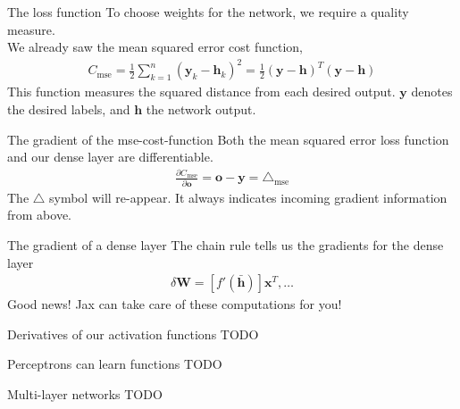 \documentclass[notes]{beamer}
\begin{document}
    \begin{frame}{The loss function}
      To choose weights for the network, we require a quality measure. \\
      We already saw the mean squared error cost function,
      \begin{align}
        C_{\text{mse}} = \frac{1}{2} \sum_{k=1}^{n} (\mathbf{y}_k - \mathbf{h}_k)^2 = \frac{1}{2} (\mathbf{y} - \mathbf{h})^T(\mathbf{y} - \mathbf{h})
      \end{align}
      This function measures the squared distance from each desired output.
      $\mathbf{y}$ denotes the desired labels, and $\mathbf{h}$ the network output.
    \end{frame}


    \begin{frame}{The gradient of the mse-cost-function}
      Both the mean squared error loss function and our dense layer are differentiable. 
      \begin{align}
        \frac{\partial C_{\text{mse}}}{\partial \mathbf{o}} = \mathbf{o} - \mathbf{y} = \triangle_{\text{mse}}
      \end{align}
      The $\triangle$ symbol will re-appear. It always indicates incoming gradient information from above.
    \end{frame}

    \begin{frame}{The gradient of a dense layer}
      The chain rule tells us the gradients for the dense layer\cite{nielsen2015neural}
      \begin{align}
        \delta \mathbf{W} = [f'(\bar{\mathbf{h}})]\mathbf{x}^T, \dots
      \end{align}
      Good news! Jax can take care of these computations for you!
    \end{frame}

    \begin{frame}{Derivatives of our activation functions}
      TODO
    \end{frame}

    \begin{frame}{Perceptrons can learn functions}
      TODO
    \end{frame}

    \begin{frame}{Multi-layer networks}
      TODO
    \end{frame}
\end{document}
